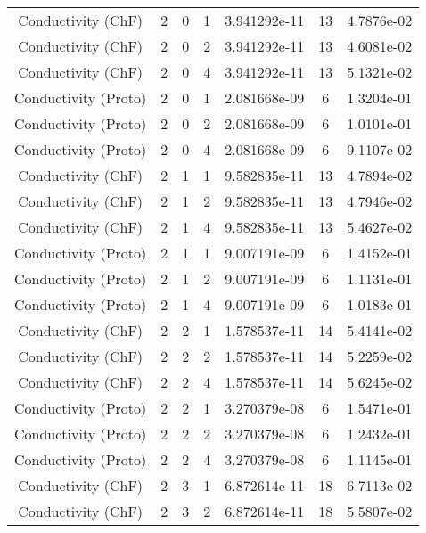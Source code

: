 \documentclass{article}
\begin{document}
\begin{small} 
  \begin{table} 
    \begin{center}
      \begin{tabular}{|c|c|c|c|c|c||c|} \hline 
        \hline 
        Conductivity    (ChF) & 2 & 0 & 1& 3.941292e-11 & 13 & 4.7876e-02\\
        Conductivity    (ChF) & 2 & 0 & 2& 3.941292e-11 & 13 & 4.6081e-02\\
        Conductivity    (ChF) & 2 & 0 & 4& 3.941292e-11 & 13 & 5.1321e-02\\
        Conductivity  (Proto) & 2 & 0 & 1& 2.081668e-09 & 6 & 1.3204e-01\\
        Conductivity  (Proto) & 2 & 0 & 2& 2.081668e-09 & 6 & 1.0101e-01\\
        Conductivity  (Proto) & 2 & 0 & 4& 2.081668e-09 & 6 & 9.1107e-02\\
        \hline 
        Conductivity    (ChF) & 2 & 1 & 1& 9.582835e-11 & 13 & 4.7894e-02\\
        Conductivity    (ChF) & 2 & 1 & 2& 9.582835e-11 & 13 & 4.7946e-02\\
        Conductivity    (ChF) & 2 & 1 & 4& 9.582835e-11 & 13 & 5.4627e-02\\
        Conductivity  (Proto) & 2 & 1 & 1& 9.007191e-09 & 6 & 1.4152e-01\\
        Conductivity  (Proto) & 2 & 1 & 2& 9.007191e-09 & 6 & 1.1131e-01\\
        Conductivity  (Proto) & 2 & 1 & 4& 9.007191e-09 & 6 & 1.0183e-01\\
        \hline 
        Conductivity    (ChF) & 2 & 2 & 1& 1.578537e-11 & 14 & 5.4141e-02\\
        Conductivity    (ChF) & 2 & 2 & 2& 1.578537e-11 & 14 & 5.2259e-02\\
        Conductivity    (ChF) & 2 & 2 & 4& 1.578537e-11 & 14 & 5.6245e-02\\
        Conductivity  (Proto) & 2 & 2 & 1& 3.270379e-08 & 6 & 1.5471e-01\\
        Conductivity  (Proto) & 2 & 2 & 2& 3.270379e-08 & 6 & 1.2432e-01\\
        Conductivity  (Proto) & 2 & 2 & 4& 3.270379e-08 & 6 & 1.1145e-01\\
        \hline 
        Conductivity    (ChF) & 2 & 3 & 1& 6.872614e-11 & 18 & 6.7113e-02\\
        Conductivity    (ChF) & 2 & 3 & 2& 6.872614e-11 & 18 & 5.5807e-02\\

\end{tabular}
\end{center}
\end{table}
\end{small}
\end{document}
